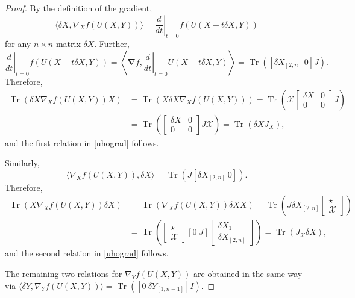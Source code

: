 \documentclass{amsart}
\theoremstyle{definition}
\theoremstyle{remark}
\numberwithin{equation}{section}
\numberwithin{theorem}{section}
\begin{document}
\begin{proof} By the definition of the gradient,
\[
  \langle \delta X, \nabla_X f(U(X,Y))\rangle=\left.\frac{d}{dt}\right\vert_{t=0} f(U(X+t \delta X, Y))
\]
for any $n\times n$ matrix $\delta X$. Further,
\[
\left.\frac{d}{dt}\right\vert_{t=0} f(U(X+t \delta X, Y))=
\left \langle{\boldsymbol\nabla} f,\left.\frac{d}{dt}\right\vert_{t=0} U(X+t \delta X, Y)  \right \rangle=
 {\operatorname{Tr}}\left([\delta X_{[2,n]}\  0]J\right).
  \]
Therefore,
\begin{equation*}
 \begin{aligned}
  {\operatorname{Tr}} \left(\delta X \nabla_X f(U(X,Y))X\right)&={\operatorname{Tr}} \left(X\delta X\nabla_X f(U(X,Y))\right)=
  {\operatorname{Tr}} \left({{\mathcal X}}\left[\begin{array}{cc}
\delta X & 0 \\ 0 & 0\end{array}\right ]J\right)\\
&={\operatorname{Tr}}\left(\left[\begin{array}{cc}
\delta X & 0 \\ 0 & 0\end{array}\right ]J{{\mathcal X}}\right)={\operatorname{Tr}}(\delta XJ_X),
 \end{aligned}
\end{equation*}
and the first relation in \eqref{uhograd} follows.
 
Similarly,
\[
 \langle\nabla_X f(U(X,Y)), \delta X\rangle={\operatorname{Tr}} \left(J[\delta X_{[2,n]}\  0]\right).
\]
Therefore,
\begin{equation*}
 \begin{aligned}
  {\operatorname{Tr}} \left( X \nabla_X f(U(X,Y))\delta X\right)&={\operatorname{Tr}} \left(\nabla_X f(U(X,Y))\delta X X\right)=
  {\operatorname{Tr}} \left(J\delta X_{[2,n]}\left[\begin{array}{c}
\star  \\ {{\mathcal X}}\end{array}\right ]\right)\\
&={\operatorname{Tr}}\left(\left[\begin{array}{c}
\star \\ {{\mathcal X}}\end{array}\right ][0\  J]\left[\begin{array}{c}
\delta X_1 \\ \delta X_{[2,n]}\end{array}\right ]\right)={\operatorname{Tr}}(J_{{\mathcal X}}\delta X),
 \end{aligned}
\end{equation*}
and the second relation in \eqref{uhograd} follows.
 
The remaining two relations for  $\nabla_Y f(U(X,Y))$ are obtained in the same way via
$\langle \delta Y, \nabla_Y f(U(X,Y))\rangle ={\operatorname{Tr}}\left ( [0\  \delta Y_{[1,n-1]}]I\right)$.
\end{proof}
\end{document}
